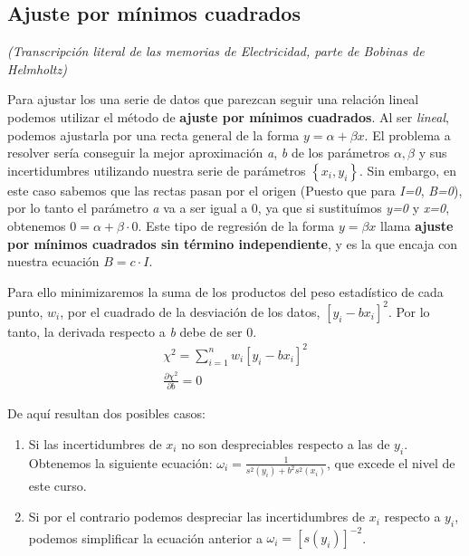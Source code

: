 \documentclass[12pt, a4paper, titlepage]{article}
\begin{document}
  \newpage
  \begin{appendices}
    \makeatletter

    \section{Ajuste por mínimos cuadrados}
    \label{s:ajustemc}

    \textit{(Transcripción literal de las memorias de Electricidad, parte de Bobinas de Helmholtz)}

    Para ajustar los una serie de datos que parezcan seguir una relación lineal podemos utilizar el método de \textbf{ajuste por mínimos cuadrados}. Al ser \textit{lineal}, podemos ajustarla por una recta general de la forma $y = \alpha + \beta x$. El problema a resolver sería conseguir la mejor aproximación \textit{a}, \textit{b} de los parámetros $\alpha, \beta$ y sus incertidumbres utilizando nuestra serie de parámetros $\left\{ x_i, y_i \right\}$. Sin embargo, en este caso sabemos que las rectas pasan por el origen (Puesto que para \textit{I=0}, \textit{B=0}), por lo tanto el parámetro \textit{a} va a ser igual a 0, ya que si sustituímos \textit{y=0} y \textit{x=0}, obtenemos $0 = \alpha + \beta \cdot 0$. Este tipo de regresión de la forma $y = \beta x$ llama \textbf{ajuste por mínimos cuadrados sin término independiente}, y es la que encaja con nuestra ecuación $B = c \cdot I$.

    Para ello minimizaremos la suma de los productos del peso estadístico de cada punto, $w_i$, por el cuadrado de la desviación de los datos, $[y_i - bx_i]^2$. Por lo tanto, la derivada respecto a \textit{b} debe de ser 0.
    \begin{gather}
      \chi^2 = \sum^{n}_{i=1} w_i[y_i - bx_i]^2 \label{ec:chi2} \\
      \frac{\partial \chi^2}{\partial b}=0 \label{ec:deriv}
    \end{gather}

    De aquí resultan dos posibles casos:

    \begin{enumerate}
      \item Si las incertidumbres de $x_i$ no son despreciables respecto a las de $y_i$. Obtenemos la siguiente ecuación: $\omega_i=\frac{1}{s^2(y_i)+b^2s^2(x_i)}$, que excede el nivel de este curso.
      \item Si por el contrario podemos despreciar las incertidumbres de $x_i$ respecto a $y_i$, podemos simplificar la ecuación anterior a $\omega_i=[s(y_i)]^{-2}$.
    \end{enumerate}


\end{appendices}
\end{document}
